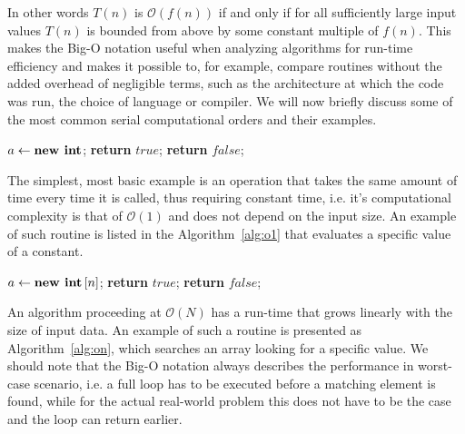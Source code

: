 In other words $T(n)$ is $\mathcal{O}\left(f(n)\right)$ if and only if for all sufficiently large input values $T(n)$ is bounded from above by some constant multiple of $f(n)$.
This makes the Big-O notation useful when analyzing algorithms for run-time efficiency and makes it possible to, for example, compare routines without the added overhead of negligible terms, such as the architecture at which the code was run, the choice of language or compiler.
We will now briefly discuss some of the most common serial computational orders and their examples. 

\begin{algorithm}[H]
\centering
\begin{algorithmic}[1]
\State $a \gets \text{\textbf{new int}}$;
%
%
\State \textbf{return} $true$;
%
\Else 
%
\State \textbf{return} $false$;
%
\EndIf
\end{algorithmic}
\caption{
{ \footnotesize 
{\bf Single test operation.} 
} %
}
\label{alg:o1}
\end{algorithm}

The simplest, most basic example is an operation that takes the same amount of time every time it is called, thus requiring constant time, i.e. it's computational complexity is that of $\mathcal{O}\left(1\right)$ and does not depend on the input size.
An example of such routine is listed in the Algorithm~\ref{alg:o1} that evaluates a specific value of a constant.

\begin{algorithm}[H]
\centering
\begin{algorithmic}[1]
\State $a \gets \text{\textbf{new int}}\left[n\right]$;
%
%
%
\State \textbf{return} $true$;
%
\Else 
%
\State \textbf{return} $false$;
%
\EndIf
%
\EndFor
\end{algorithmic}
\caption{
{ \footnotesize 
{\bf Search for a value.} 
}%
}
\label{alg:on}
\end{algorithm}

An algorithm proceeding at $\mathcal{O}\left(N\right)$ has a run-time that grows linearly with the size of input data.
An example of such a routine is presented as Algorithm~\ref{alg:on}, which searches an array looking for a specific value.
We should note that the Big-O notation always describes the performance in worst-case scenario, i.e. a full loop has to be executed before a matching element is found, while for the actual real-world problem this does not have to be the case and the loop can return earlier.

